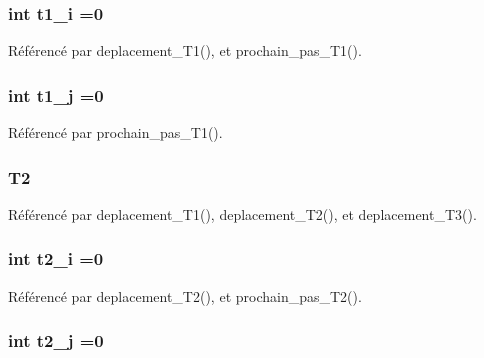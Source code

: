 \subsubsection[{t1\+\_\+i}]{\setlength{\rightskip}{0pt plus 5cm}int t1\+\_\+i =0}\label{thread_8h_af6ffa3874789c1110bfa3560595be366}


Référencé par deplacement\+\_\+\+T1(), et prochain\+\_\+pas\+\_\+\+T1().

\subsubsection[{t1\+\_\+j}]{\setlength{\rightskip}{0pt plus 5cm}int t1\+\_\+j =0}\label{thread_8h_ad42771e3cfc13cf554e80f172ee24850}


Référencé par prochain\+\_\+pas\+\_\+\+T1().

\subsubsection[{T2}]{ T2}\label{thread_8h_a2f9633591cf59fbea33044d61e3b12df}


Référencé par deplacement\+\_\+\+T1(), deplacement\+\_\+\+T2(), et deplacement\+\_\+\+T3().

\subsubsection[{t2\+\_\+i}]{\setlength{\rightskip}{0pt plus 5cm}int t2\+\_\+i =0}\label{thread_8h_a7eb268dc73344b7b5bb1c4ad1e9b8029}


Référencé par deplacement\+\_\+\+T2(), et prochain\+\_\+pas\+\_\+\+T2().

\subsubsection[{t2\+\_\+j}]{\setlength{\rightskip}{0pt plus 5cm}int t2\+\_\+j =0}\label{thread_8h_ab88718510b8996c0a7add100d4bc2c26}


